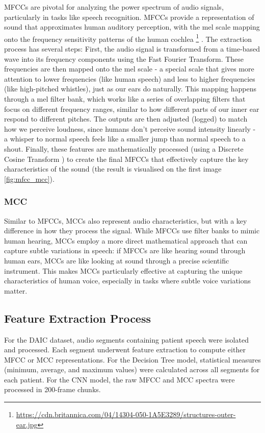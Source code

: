 MFCCs are pivotal for analyzing the power spectrum of audio signals, particularly in tasks like speech recognition. MFCCs provide a representation of sound that approximates human auditory perception, with the mel scale mapping onto the frequency sensitivity patterns of the human cochlea \footnote{\url{https://cdn.britannica.com/04/14304-050-1A5E3289/structures-outer-ear.jpg}} . The extraction process has several steps: First, the audio signal is transformed from a time-based wave into its frequency components using the Fast Fourier Transform. These frequencies are then mapped onto the mel scale - a special scale that gives more attention to lower frequencies (like human speech) and less to higher frequencies (like high-pitched whistles), just as our ears do naturally. This mapping happens through a mel filter bank, which works like a series of overlapping filters that focus on different frequency ranges, similar to how different parts of our inner ear respond to different pitches. The outputs are then adjusted (logged) to match how we perceive loudness, since humans don't perceive sound intensity linearly - a whisper to normal speech feels like a smaller jump than normal speech to a shout. Finally, these features are mathematically processed (using a Discrete Cosine Transform \cite{wikidct}) to create the final MFCCs that effectively capture the key characteristics of the sound (the result is visualised on the first image \ref{fig:mfcc_mcc}).

\subsubsection{MCC}
Similar to MFCCs, MCCs also represent audio characteristics, but with a key difference in how they process the signal. While MFCCs use filter banks to mimic human hearing, MCCs employ a more direct mathematical approach that can capture subtle variations in speech: if MFCCs are like hearing sound through human ears, MCCs are like looking at sound through a precise scientific instrument. This makes MCCs particularly effective at capturing the unique characteristics of human voice, especially in tasks where subtle voice variations matter.

\subsection{Feature Extraction Process}
For the DAIC dataset, audio segments containing patient speech were isolated and processed. Each segment underwent feature extraction to compute either MFCC or MCC representations. For the Decision Tree model, statistical measures (minimum, average, and maximum values) were calculated across all segments for each patient. For the CNN model, the raw MFCC and MCC spectra were processed in 200-frame chunks.

